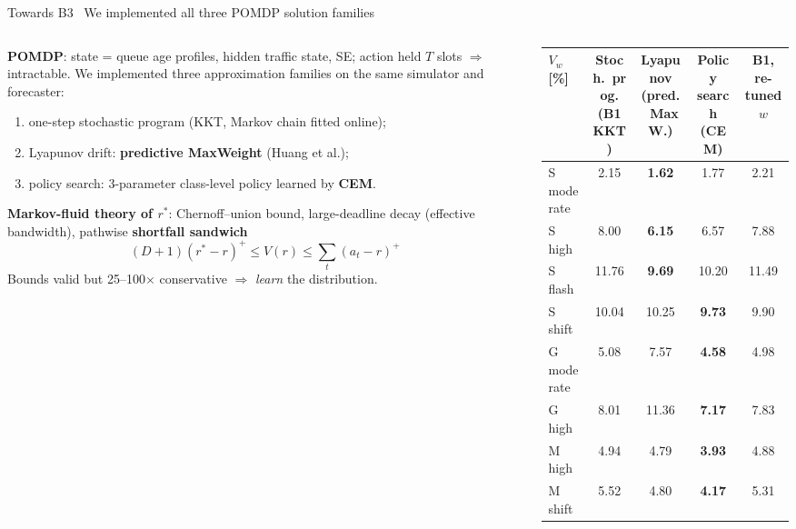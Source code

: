 \documentclass[aspectratio=169,10pt,xcolor={table,dvipsnames}]{beamer}
\newcommand{\rstar}{r^{\ast}}
\begin{document}
\begin{frame}{Towards B3 \textbullet\ We implemented all three POMDP solution families}
\begin{columns}[T]
\begin{column}{0.45\textwidth}
\footnotesize
\textbf{POMDP}: state = queue age profiles, hidden traffic state, SE; action held $T$ slots $\Rightarrow$ intractable. We implemented three approximation families on the same simulator and forecaster:
\begin{enumerate}
  \item one-step stochastic program (KKT, Markov chain fitted online);
  \item Lyapunov drift: \textbf{predictive MaxWeight} (Huang et al.);
  \item policy search: 3-parameter class-level policy learned by \textbf{CEM}.
\end{enumerate}
\textbf{Markov-fluid theory of $\rstar$}: Chernoff--union bound, large-deadline decay (effective bandwidth), pathwise \textbf{shortfall sandwich}
\[ (D+1)(\rstar - r)^+ \le V(r) \le \textstyle\sum_t (a_t - r)^+ \]
Bounds valid but 25--100$\times$ conservative $\Rightarrow$ \emph{learn} the distribution.
\end{column}
\begin{column}{0.53\textwidth}
\scriptsize
\setlength{\tabcolsep}{3.5pt}
\begin{tabular}{lcccc}
\toprule
$V_w$ [\%] & \makecell{Stoch.\ prog.\\(B1 KKT)} & \makecell{Lyapunov\\(pred.\ MaxW.)} & \makecell{Policy search\\(CEM)} & \makecell{B1,\\re-tuned $w$} \\
\midrule
S moderate & 2.15 & \textbf{1.62} & 1.77 & 2.21 \\
S high & 8.00 & \textbf{6.15} & 6.57 & 7.88 \\
S flash & 11.76 & \textbf{9.69} & 10.20 & 11.49 \\
S shift & 10.04 & 10.25 & \textbf{9.73} & 9.90 \\
G moderate & 5.08 & 7.57 & \textbf{4.58} & 4.98 \\
G high & 8.01 & 11.36 & \textbf{7.17} & 7.83 \\
M high & 4.94 & 4.79 & \textbf{3.93} & 4.88 \\
M shift & 5.52 & 4.80 & \textbf{4.17} & 5.31 \\

\end{tabular}
\end{column}
\end{columns}
\end{frame}
\end{document}

